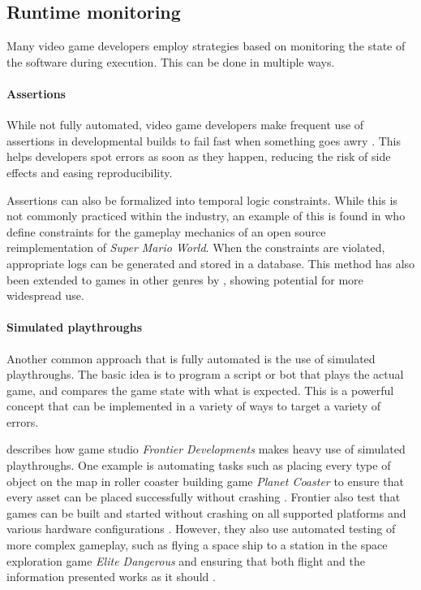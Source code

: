 \documentclass{article}
\begin{document}
    \subsection{Runtime monitoring}
    Many video game developers employ strategies based on monitoring the state of the software during execution. This can be done in multiple ways.

    \paragraph{Assertions}
    While not fully automated, video game developers make frequent use of assertions in developmental builds to fail fast when something goes awry \parencite{parsons2015tdd}. This helps developers spot errors as soon as they happen, reducing the risk of side effects and easing reproducibility. 
    
    Assertions can also be formalized into temporal logic constraints. While this is not commonly practiced within the industry, an example of this is found in \textcite{varvaressos2013runtime} who define constraints for the gameplay mechanics of an open source reimplementation of \emph{Super Mario World}. When the constraints are violated, appropriate logs can be generated and stored in a database. This method has also been extended to games in other genres by \textcite{varvaressos2017automated}, showing potential for more widespread use.

    \paragraph{Simulated playthroughs} 
    Another common approach that is fully automated is the use of simulated playthroughs. The basic idea is to program a script or bot that plays the actual game, and compares the game state with what is expected. This is a powerful concept that can be implemented in a variety of ways to target a variety of errors. 
    
    \textcite{yarwood2020qa} describes how game studio \emph{Frontier Developments} makes heavy use of simulated playthroughs. One example is automating tasks such as placing every type of object on the map in roller coaster building game \emph{Planet Coaster} to ensure that every asset can be placed successfully without crashing \parencite{yarwood2020qa}. Frontier also test that games can be built and started without crashing on all supported platforms and various hardware configurations \parencite{yarwood2020qa}. However, they also use automated testing of more complex gameplay, such as flying a space ship to a station in the space exploration game \emph{Elite Dangerous} and ensuring that both flight and the information presented works as it should \parencite{yarwood2020qa}. 
\end{document}
